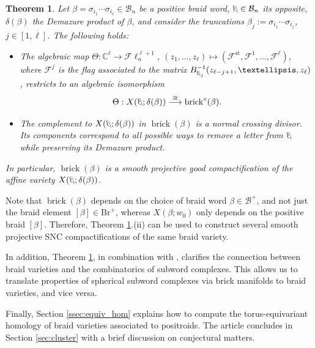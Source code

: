 \documentclass[10pt]{amsart}
\theoremstyle{plain}
\newtheorem{thm}{Theorem}[section]
\theoremstyle{definition}
\theoremstyle{remark}
\numberwithin{equation}{section}
\newcommand{\lr}{\longrightarrow}
\newcommand{\std}{\text{st}}
\newcommand{\bC}{\mathbb{C}}
\newcommand{\cB}{\mathcal{B}}
\newcommand{\cF}{\mathscr{F}}
\newcommand{\Fl}{\mathscr{F}\ell}
\newcommand{\brick}{\operatorname{brick}}
\newcommand{\Br}{\mathrm{Br}}
\newcommand{\MG}[1]{{\color{teal}{{\bf Misha}: #1}}}
\DeclareRobustCommand{\ateb}{\text{\reflectbox{$\beta$}}}
\begin{document}
\begin{thm}	\label{thm: intro brick} Let $\beta = \sigma_{i_{1}}\cdots\sigma_{i_{\ell}}\in\cB_n$ be a positive braid word, $\ateb\in\cB_n$ its opposite, $\delta(\beta)$ the Demazure product of $\beta$, and consider the truncations $\beta_{j} := \sigma_{i_{1}}\cdots \sigma_{i_{j}}$, $j\in[1,\ell]$. The following holds:
	
	\begin{itemize}
		\item[$(i)$] The algebraic map $\Theta:\bC^{\ell}\lr\Fl_n^{\ell+1}$, $(z_1, \dots, z_{\ell}) \mapsto (\cF^{\std}, \cF^{1}, \dots, \cF^{\ell}),$
		where $\cF^{j}$ is the flag associated to the matrix $B_{\ateb_{j}}^{-1}(z_{\ell - j + 1}, \dots, z_{\ell})$, restricts to an algebraic isomorphism
		$$\Theta:	X(\ateb; \delta(\beta)) \stackrel{\cong}{\lr} \brick^{\circ}(\beta).$$
				
		\item[$(ii)$] 
		The complement to $X(\ateb; \delta(\beta))$ in $\brick(\beta)$ is a normal crossing divisor. Its components correspond to all possible ways to remove a letter from $\ateb$ while preserving its Demazure product.
	\end{itemize}
In particular, $\brick(\beta)$ is a smooth projective good compactification of the affine variety $X(\ateb;\delta(\beta))$.
\end{thm}

\noindent Note that $\brick(\beta)$ depends on the choice of braid word $\beta\in\cB^+$, and not just the braid element $[\beta]\in\Br^+$, whereas $X(\beta;w_0)$ only depends on the positive braid $[\beta]$. Therefore, Theorem \ref{thm: intro brick}.(ii) can be used to construct several smooth projective SNC compactifications of the same braid variety.

\noindent In addition, Theorem \ref{thm: intro brick},  in combination with \cite{Escobar}, clarifies the connection between braid varieties and the combinatorics of subword complexes. This allows us to translate properties of spherical subword complexes via brick manifolds to braid varieties, and vice versa.%

\noindent Finally, Section \ref{ssec:equiv_hom} explains how to compute the torus-equivariant homology of braid varieties associated to positroids. The article concludes in Section \ref{sec:cluster} with a brief discussion on conjectural matters.\\
\end{document}
